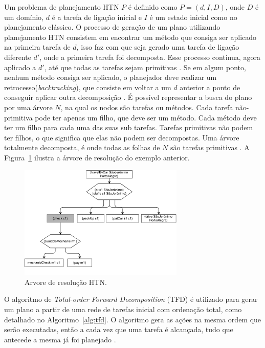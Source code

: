 Um problema de planejamento HTN $P$ é definido como $P = (d, I, D)$, onde $D$ é um domínio, $d$ é a tarefa de ligação inicial e $I$ é um estado inicial como no planejamento clássico. 
O processo de geração de um plano utilizando planejamento HTN consistem em encontrar um método que consiga ser aplicado na primeira tarefa de $d$, isso faz com que seja gerado uma tarefa de ligação diferente $d'$, onde a primeira tarefa foi decomposta. 
Esse processo continua, agora aplicado a $d'$, até que todas as tarefas sejam primitivas \cite{meneguzzi2015planning}. 
Se em algum ponto, nenhum método consiga ser aplicado, o planejador deve realizar um retrocesso(\textit{backtracking}), que consiste em voltar a um $d$ anterior a ponto de conseguir aplicar outra decomposição \cite{intelligence2003modern}. 
É possível representar a busca do plano por uma árvore $N$, na qual os nodos são tarefas ou métodos. 
Cada tarefa não-primitiva pode ter apenas um filho, que deve ser um método. 
Cada método deve ter um filho para cada uma das suas sub tarefas. 
Tarefas primitivas não podem ter filhos, o que significa que elas não podem ser decompostas. 
Uma árvore totalmente decomposta, é onde todas as folhas de $N$ são tarefas primitivas \cite{ontanon2015adversarial}. 
A Figura~\ref{fig:htnmethodtree} ilustra a árvore de resolução do exemplo anterior.

\begin{figure}[ht]
	\centering
	\includegraphics[width=0.7\textwidth]{fig/htnmethodresult.pdf}
	\caption{Arvore de resolução HTN.}
	\label{fig:htnmethodtree}
\end{figure}

O algoritmo de \textit{Total-order Forward Decomposition} (TFD) é utilizado para gerar um plano a partir de uma rede de tarefas inicial com ordenação total, como detalhado no Algoritmo~\ref{alg:tfd}.
O algoritmo gera as ações na mesma ordem que serão executadas, então a cada vez que uma tarefa é alcançada, tudo que antecede a mesma já foi planejado \cite{ghallab2004automated}.
 
